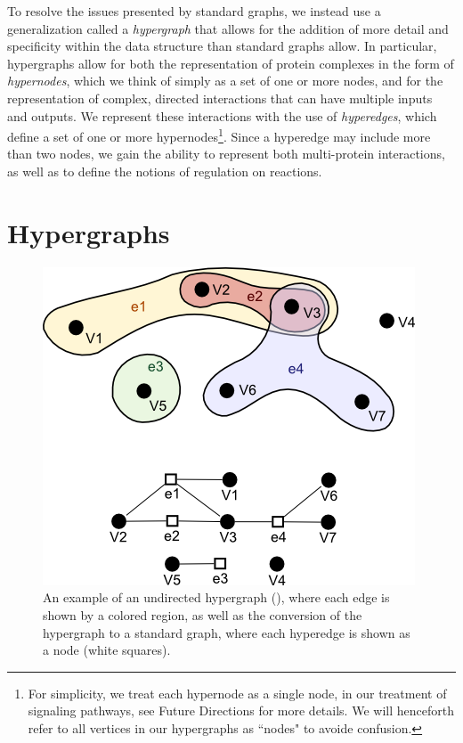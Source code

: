 \documentclass[12pt,twoside]{reedthesis}
\theoremstyle{definition}
\begin{document}
To resolve the issues presented by standard graphs, we instead use a generalization called a \textit{hypergraph} that allows for the addition of more detail  and specificity within the data structure than standard graphs allow.  In particular, hypergraphs allow for both the representation of protein complexes in the form of \textit{hypernodes}, which we think of simply as a set of one or more nodes, and for the representation of complex, directed interactions that can have multiple inputs and outputs.  We represent these interactions with the use of \textit{hyperedges}, which define a set of one or more hypernodes\footnote{For simplicity, we treat each hypernode as a single node, in our treatment of signaling pathways, see Future Directions for more details. We will henceforth refer to all vertices in our hypergraphs as ``nodes" to avoide confusion.}.  Since a hyperedge may include more than two nodes, we gain the ability to represent both multi-protein interactions, as well as to define the notions of regulation on reactions.\par

\section{Hypergraphs}

\begin{figure}[thbp]
  \begin{center}
    \includegraphics[width=\textwidth/2]{undirected_hypergraph}
  \caption[An example undirected hypergraph]{An example of an undirected hypergraph (\cite{sharpen}), where each edge is shown by a colored region, as well as the conversion of the hypergraph to a standard graph, where each hyperedge is shown as a node (white squares).}
  \label{fig:undirected_hypergraph}
  \end{center}
\end{figure}
\end{document}
